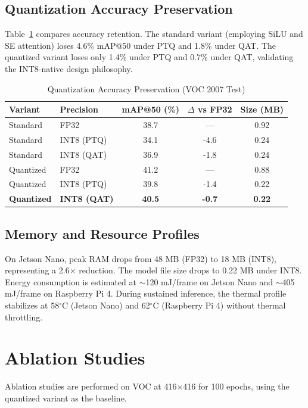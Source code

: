 \documentclass[journal]{IEEEtran}
\begin{document}
\subsection{Quantization Accuracy Preservation}
Table~\ref{tab:quantization_preservation} compares accuracy retention. The standard variant (employing SiLU and SE attention) loses 4.6\% mAP@50 under PTQ and 1.8\% under QAT. The quantized variant loses only 1.4\% under PTQ and 0.7\% under QAT, validating the INT8-native design philosophy.

\begin{table}[h]
\centering
\caption{Quantization Accuracy Preservation (VOC 2007 Test)}
\label{tab:quantization_preservation}
\setlength{\tabcolsep}{4pt}
\begin{tabular}{llccc}
\toprule
Variant & Precision & mAP@50 (\%) & $\Delta$ vs FP32 & Size (MB) \\
\midrule
Standard & FP32 & 38.7 & --- & 0.92 \\
Standard & INT8 (PTQ) & 34.1 & -4.6 & 0.24 \\
Standard & INT8 (QAT) & 36.9 & -1.8 & 0.24 \\
Quantized & FP32 & 41.2 & --- & 0.88 \\
Quantized & INT8 (PTQ) & 39.8 & -1.4 & 0.22 \\
\textbf{Quantized} & \textbf{INT8 (QAT)} & \textbf{40.5} & \textbf{-0.7} & \textbf{0.22} \\
\bottomrule
\end{tabular}
\end{table}

\subsection{Memory and Resource Profiles}
On Jetson Nano, peak RAM drops from 48 MB (FP32) to 18 MB (INT8), representing a 2.6$\times$ reduction. The model file size drops to 0.22 MB under INT8. Energy consumption is estimated at $\sim$120 mJ/frame on Jetson Nano and $\sim$405 mJ/frame on Raspberry Pi 4. During sustained inference, the thermal profile stabilizes at 58$^\circ$C (Jetson Nano) and 62$^\circ$C (Raspberry Pi 4) without thermal throttling.

\section{Ablation Studies}
Ablation studies are performed on VOC at 416$\times$416 for 100 epochs, using the quantized variant as the baseline.
\end{document}

